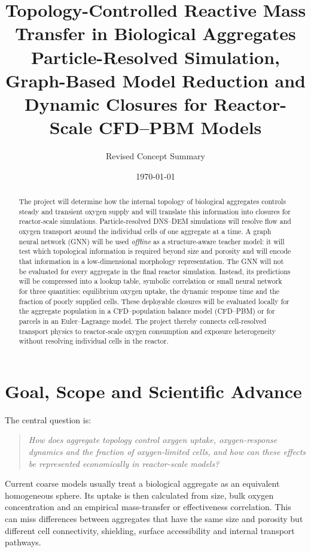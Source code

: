 \documentclass[11pt,a4paper]{article}
\title{\textbf{Topology-Controlled Reactive Mass Transfer in Biological Aggregates}\\[0.7em]
  \large Particle-Resolved Simulation, Graph-Based Model Reduction and
  Dynamic Closures for Reactor-Scale CFD--PBM Models}
\author{Revised Concept Summary}
\date{\today}
\begin{document}
\maketitle

\begin{abstract}
The project will determine how the internal topology of biological aggregates
controls steady and transient oxygen supply and will translate this information
into closures for reactor-scale simulations. Particle-resolved DNS--DEM
simulations will resolve flow and oxygen transport around the individual cells
of one aggregate at a time. A graph neural network (GNN) will be used
\emph{offline} as a structure-aware teacher model: it will test which
topological information is required beyond size and porosity and will encode
that information in a low-dimensional morphology representation. The GNN will
not be evaluated for every aggregate in the final reactor simulation. Instead,
its predictions will be compressed into a lookup table, symbolic correlation
or small neural network for three quantities: equilibrium oxygen uptake, the
dynamic response time and the fraction of poorly supplied cells. These
deployable closures will be evaluated locally for the aggregate population in
a CFD--population balance model (CFD--PBM) or for parcels in an
Euler--Lagrange model. The project thereby connects cell-resolved transport
physics to reactor-scale oxygen consumption and exposure heterogeneity without
resolving individual cells in the reactor.
\end{abstract}

\section{Goal, Scope and Scientific Advance}

The central question is:

\begin{quote}
\itshape
How does aggregate topology control oxygen uptake, oxygen-response dynamics
and the fraction of oxygen-limited cells, and how can these effects be
represented economically in reactor-scale models?
\end{quote}

Current coarse models usually treat a biological aggregate as an equivalent
homogeneous sphere. Its uptake is then calculated from size, bulk oxygen
concentration and an empirical mass-transfer or effectiveness correlation.
This can miss differences between aggregates that have the same size and
porosity but different cell connectivity, shielding, surface accessibility and
internal transport pathways.
\end{document}
